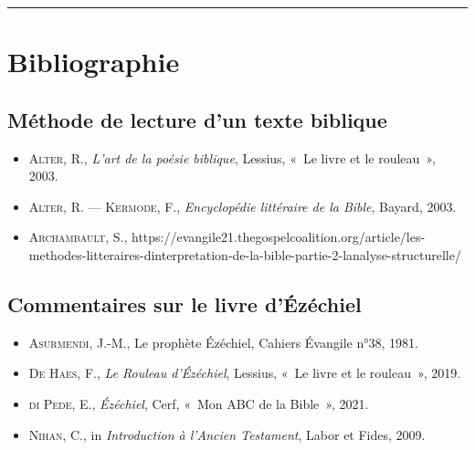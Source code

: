 \begin{center}\rule{0.5\linewidth}{1pt}\end{center}
\section*{Bibliographie}
\subsection*{Méthode de lecture d'un texte biblique}
\begin{itemize}[label=]
\item \textsc{Alter, R.}, \textit{L'art de la poésie biblique}, Lessius, «~Le livre et le rouleau~», 2003.
\item \textsc{Alter, R. — Kermode, F.}, \textit{Encyclopédie littéraire de la Bible}, Bayard, 2003.
\item \textsc{Archambault, S.}, https://evangile21.thegospelcoalition.org/article/les-methodes-litteraires-dinterpretation-de-la-bible-partie-2-lanalyse-structurelle/
\end{itemize}
\subsection*{Commentaires sur le livre d'Ézéchiel}
\begin{itemize}[label=]
\item \textsc{Asurmendi, J.-M.}, Le prophète Ézéchiel, Cahiers Évangile n°38, 1981.
\item \textsc{De Haes, F.}, \textit{Le Rouleau d'Ézéchiel}, Lessius, «~Le livre et le rouleau~», 2019.
\item \textsc{di Pede, E.}, \textit{Ézéchiel}, Cerf, «~Mon ABC de la Bible~», 2021.
\item \textsc{Nihan, C.}, in \textit{Introduction à l'Ancien Testament}, Labor et Fides, 2009.
\end{itemize}